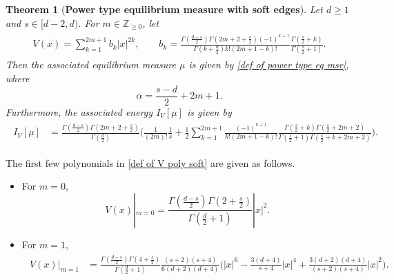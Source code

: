 \documentclass[10pt]{amsart}
\theoremstyle{plain}
\newtheorem{thm}{Theorem}[section]
\theoremstyle{remark}
\numberwithin{equation}{section}
\begin{document}
\begin{thm}[\textbf{Power type equilibrium measure with soft edges}] \label{Thm_eq msr power type}
Let $d \ge 1$ and $s \in [d-2,d)$.  For $m \in \mathbb{Z}_{ \ge 0 }$, let   
\begin{align}
\begin{split}  \label{def of V poly soft}
V(x) =   \sum_{k=1}^{2m+1} b_k  |x|^{2k} ,   
\qquad b_k  =   \frac{  \Gamma(\frac{d-s}{2}) \Gamma(2m+2+\frac{s}{2} ) (-1)^{k+1}  }{\Gamma(k+\frac{d}{2})  k!(2m+1-k)!  }  \frac{ \Gamma(\frac{s}{2}+k) }{ \Gamma(\frac{s}{2}+1) } .  
\end{split}
\end{align}  
Then the associated equilibrium measure $\mu$ is given by \eqref{def of power type eq msr}, where 
\begin{equation} \label{def of alpha for power}
\alpha= \frac{s-d}{2}+2m+1. 
\end{equation}
Furthermore, the associated energy $I_V[\mu]$ is given by 
\begin{align}
\begin{split}  \label{energy for power type eq msr}
I_V[\mu]&=    \frac{ \Gamma(\frac{d-s}{2})  \Gamma(2m+2+\frac{s}{2} ) }{  \Gamma(\frac{d}{2})   }  \bigg( \frac{1}{(2m)!}\frac{1}{s} + \frac12 \sum_{k=1}^{2m+1}  \frac{ (-1)^{k+1}  }{  k!(2m+1-k)!  }  \frac{ \Gamma(\frac{s}{2}+k) \Gamma(\frac{s}{2}+2m+2) }{ \Gamma(\frac{s}{2}+1)\Gamma(\frac{s}{2}+k+2m+2) }  \bigg). 
\end{split}
\end{align}
\end{thm} 








 

The first few polynomials in \eqref{def of V poly soft} are given as follows. 

\begin{itemize}
    \item For $m=0$, 
    \begin{equation} \label{V purely quadratic}
V(x)|_{m=0} =     \frac{  \Gamma(\frac{d-s}{2}) \Gamma(2+\frac{s}{2} ) }{  \Gamma(\frac{d}{2}+1) } |x|^2. 
\end{equation}
    \item For $m=1$, 
\begin{align}
\begin{split}
V(x)|_{m=1}&=      \frac{ \Gamma(\frac{d-s}{2}) \Gamma(4+\frac{s}{2} ) }{ \Gamma(\frac{d}{2}+1) }  \frac{   (s+2)(s+4) }{6(d+2)(d+4)  } 
\Big(  |x|^6-\frac{3(d+4)}{ s+4 }|x|^4+\frac{3(d+2)(d+4)}{ (s+2)(s+4) }|x|^2 \Big) . 
\end{split}
\end{align} 
\end{itemize}
\end{document}
